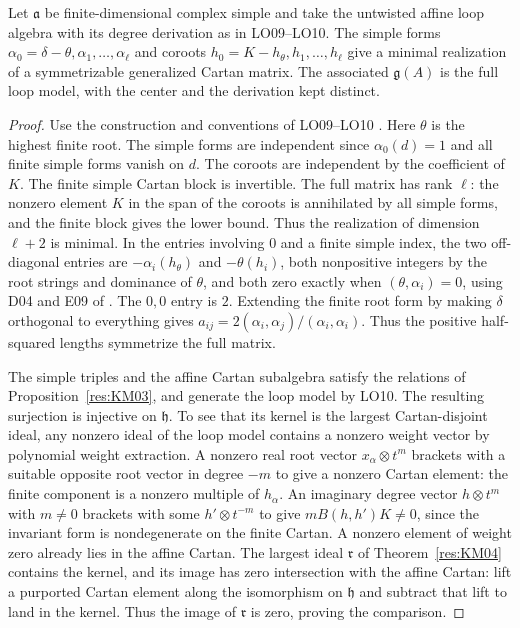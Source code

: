 \begin{proposition}
\label{res:KM09}
Let \(\mathfrak a\) be finite-dimensional complex simple and take
the untwisted affine loop algebra with its degree derivation
as in LO09--LO10. The simple forms
\(\alpha_0=\delta-\theta,\alpha_1,\ldots,\alpha_\ell\) and
coroots \(h_0=K-h_\theta,h_1,\ldots,h_\ell\) give a
minimal realization of a symmetrizable generalized Cartan
matrix. The associated \(\mathfrak g(A)\) is the full loop
model, with the center and the derivation kept distinct.
\end{proposition}

\begin{proof}
Use the construction and conventions of LO09--LO10
\cite[PDF p.~26]{mg-reptopics}. Here \(\theta\) is the highest
finite root. The simple forms are independent since
\(\alpha_0(d)=1\) and all finite simple forms vanish on \(d\).
The coroots are independent by the coefficient of \(K\).
The finite simple Cartan block is invertible. The full matrix
has rank \(\ell\): the nonzero element \(K\) in the span of the
coroots is annihilated by all simple forms, and the finite block
gives the lower bound. Thus the realization of dimension
\(\ell+2\) is minimal. In the entries involving \(0\) and a
finite simple index, the two off-diagonal entries are
\(-\alpha_i(h_\theta)\) and \(-\theta(h_i)\), both nonpositive
integers by the root strings and dominance of \(\theta\), and
both zero exactly when \((\theta,\alpha_i)=0\), using D04 and
E09 of \cite[PDF pp.~24--25, 34--35]{mg-lie}.
The \(0,0\) entry is \(2\). Extending the finite root form
by making \(\delta\) orthogonal to everything gives
\(a_{ij}=2(\alpha_i,\alpha_j)/(\alpha_i,\alpha_i)\).
Thus the positive half-squared lengths symmetrize the full matrix.

The simple triples and the affine Cartan subalgebra satisfy the
relations of Proposition~\ref{res:KM03}, and generate the loop
model by LO10. The resulting surjection is injective on
\(\mathfrak h\). To see that its kernel is the largest
Cartan-disjoint ideal, any nonzero ideal of the loop model
contains a nonzero weight vector by polynomial weight
extraction. A nonzero real root vector
\(x_\alpha\otimes t^m\) brackets with a suitable opposite
root vector in degree \(-m\) to give a nonzero Cartan
element: the finite component is a nonzero multiple of
\(h_\alpha\). An imaginary degree vector
\(h\otimes t^m\) with \(m\ne0\) brackets with some
\(h'\otimes t^{-m}\) to give
\(m B(h,h')K\ne0\), since the invariant form is nondegenerate
on the finite Cartan. A nonzero element of weight zero
already lies in the affine Cartan. The largest ideal
\(\mathfrak r\) of Theorem~\ref{res:KM04} contains the kernel,
and its image has zero intersection with the affine Cartan:
lift a purported Cartan element along the isomorphism on
\(\mathfrak h\) and subtract that lift to land in the
kernel. Thus the image of \(\mathfrak r\) is zero, proving
the comparison.
\end{proof}

